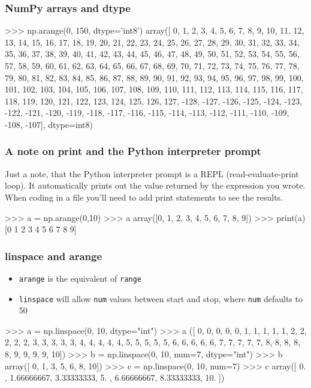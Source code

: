 \documentclass{beamer}
\begin{document}
\begin{frame}[fragile]
\frametitle{NumPy arrays and dtype}
\begin{code}
>>> np.arange(0, 150, dtype='int8')
array([   0,    1,    2,    3,    4,    5,    6,    7,    8,    9,   10,
         11,   12,   13,   14,   15,   16,   17,   18,   19,   20,   21,
         22,   23,   24,   25,   26,   27,   28,   29,   30,   31,   32,
         33,   34,   35,   36,   37,   38,   39,   40,   41,   42,   43, 
         44,   45,   46,   47,   48,   49,   50,   51,   52,   53,   54,
         55,   56,   57,   58,   59,   60,   61,   62,   63,   64,   65,
         66,   67,   68,   69,   70,   71,   72,   73,   74,   75,   76,
         77,   78,   79,   80,   81,   82,   83,   84,   85,   86,   87,
         88,   89,   90,   91,   92,   93,   94,   95,   96,   97,   98,
         99,  100,  101,  102,  103,  104,  105,  106,  107,  108,  
        109, 110,  111,  112,  113,  114,  115,  116,  117,  118,  
        119,  120, 121,  122,  123,  124,  125,  126,  127, -128, 
       -127, -126, -125, -124, -123, -122, -121, -120, -119, 
       -118, -117, -116, -115, -114, -113, -112, -111, -110, 
       -109, -108, -107], dtype=int8)
\end{code}
\end{frame}

\begin{frame}[fragile]
\frametitle{A note on print and the Python interpreter prompt}
Just a note, that the Python interpreter prompt is a REPL (read-evaluate-print loop). It automatically prints out the value returned by the expression you wrote. When coding in a file you'll need to add print statements to see the results.
\begin{code}
>>> a = np.arange(0,10)
>>> a
array([0, 1, 2, 3, 4, 5, 6, 7, 8, 9])
>>> print(a)
[0 1 2 3 4 5 6 7 8 9]
\end{code}
\end{frame}

\begin{frame}[fragile]
\frametitle{linspace and arange}
\begin{itemize}
\item \texttt{arange} is the equivalent of \texttt{range}
\item \texttt{linspace} will allow \texttt{num} values between start
  and stop, where \texttt{num} defaults to 50
\end{itemize}
\begin{code}
>>> a = np.linspace(0, 10, dtype="int")
>>> a
([ 0,  0,  0,  0,  0,  1,  1,  1,  1,  1,  2,  2,  2,  2,  2,  3, 
        3,  3,  3,  3,  4,  4,  4,  4,  4,  5,  5,  5,  5,  5,  6,  6, 
        6, 6, 6,  7,  7,  7,  7,  7,  8,  8,  8,  8,  8,  9,  9,  
        9, 9, 10])
>>> b = np.linspace(0, 10, num=7, dtype="int")
>>> b
array([ 0,  1,  3,  5,  6,  8, 10])
>>> c = np.linspace(0, 10, num=7)
>>> c
array([  0. ,  1.66666667, 3.33333333,  5.   ,
         6.66666667,   8.33333333,  10.  ])
\end{code}
\end{frame}
\end{document}
